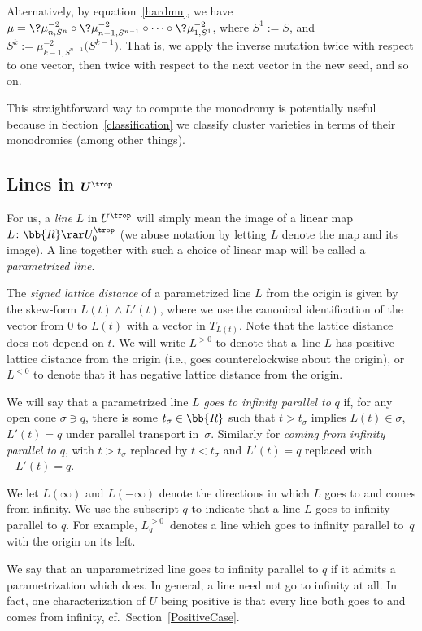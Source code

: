 Alternatively, by equation~\eqref{hardmu}, we have $\mu = \?{\mu}_{n,S^{n}}^{-2} \circ \?{\mu}_{n-1,S^{n-1}}^{-2} \circ \cdots \circ \?{\mu}_{1,S^{1}}^{-2}$, where $S^1:=S$, and $S^{k}:= \mu_{k-1,S^{n-1}}^{-2} \big(S^{k-1}\big)$. That is, we apply the inverse mutation twice with respect to one vector, then twice with respect to the next vector in the new seed, and so on.

This straightforward way to compute the monodromy is potentially useful because in Section~\ref{classification} we classify cluster varieties in terms of their monodromies (among other things).

\subsection[Lines in $U^{\trop}$]{Lines in $\boldsymbol{U^{\trop}}$} \label{lines}

For us, a {\it line} $L$ in $U^{\trop}$ will simply mean the image of a linear map $L\colon \bb{R}\rar U^{\trop}_0$ (we abuse notation by letting $L$ denote the map and its image). A line together with such a choice of linear map will be called a {\it parametrized line}.

The {\it signed lattice distance} of a parametrized line $L$ from the origin is given by the skew-form $L(t)\wedge L'(t)$, where we use the canonical identification of the vector from $0$ to $L(t)$ with a vector in $T_{L(t)}$. Note that the lattice distance does not depend on $t$. We will write $L^{>0}$ to denote that a~line $L$ has positive lattice distance from the origin (i.e., goes counterclockwise about the origin), or~$L^{<0}$ to denote that it has negative lattice distance from the origin.

We will say that a parametrized line $L$ {\it goes to infinity parallel to} $q$ if, for any open cone $\sigma \ni q$, there is some $t_\sigma\in \bb{R}$ such that $t>t_{\sigma}$ implies $L(t) \in \sigma$, $L'(t)=q$ under parallel transport in~$\sigma$. Similarly for {\it coming from infinity parallel to} $q$, with $t>t_{\sigma}$ replaced by $t<t_{\sigma}$ and $L'(t)=q$ replaced with $-L'(t)=q$.

We let $L(\infty)$ and $L(-\infty)$ denote the directions in which $L$ goes to and comes from infinity. We use the subscript $q$ to indicate that a line $L$ goes to infinity parallel to $q$. For example, $L_q^{>0}$~denotes a line which goes to infinity parallel to~$q$ with the origin on its left.

We say that an unparametrized line goes to infinity parallel to $q$ if it admits a parametrization which does. In general, a line need not go to infinity at all. In fact, one characterization of $U$ being positive is that every line both goes to and comes from infinity, cf.\ Section~\ref{PositiveCase}.

